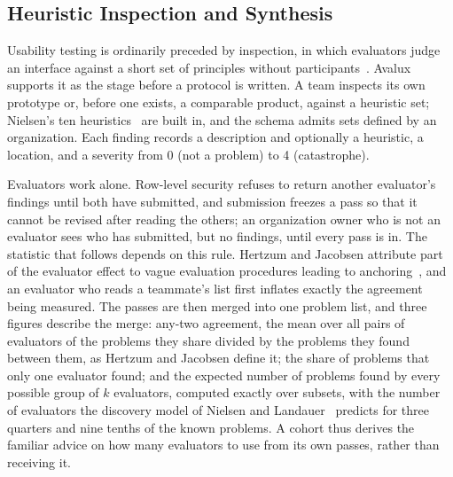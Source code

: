 \documentclass[conference]{IEEEtran}
\begin{document}
\subsection{Heuristic Inspection and Synthesis}
\label{sec:inspection}
Usability testing is ordinarily preceded by inspection, in which evaluators
judge an interface against a short set of principles without
participants~\cite{nielsen1990heuristic}. Avalux supports it as the stage
before a protocol is written. A team inspects its own prototype or, before
one exists, a comparable product, against a heuristic set; Nielsen's ten
heuristics~\cite{nielsen1994enhancing} are built in, and the schema admits
sets defined by an organization. Each finding records a description and
optionally a heuristic, a location, and a severity from 0 (not a problem)
to 4 (catastrophe).

Evaluators work alone. Row-level security refuses to return another
evaluator's findings until both have submitted, and submission freezes a
pass so that it cannot be revised after reading the others; an organization
owner who is not an evaluator sees who has submitted, but no findings,
until every pass is in. The statistic that follows depends on this rule.
Hertzum and Jacobsen attribute part of the evaluator effect to vague
evaluation procedures leading to anchoring~\cite{hertzum2001evaluator}, and
an evaluator who reads a teammate's list first inflates exactly the
agreement being measured. The passes are then merged into one problem list,
and three figures describe the merge: any-two agreement, the mean over all
pairs of evaluators of the problems they share divided by the problems they
found between them, as Hertzum and Jacobsen define it; the share of
problems that only one evaluator found; and the expected number of problems
found by every possible group of $k$ evaluators, computed exactly over
subsets, with the number of evaluators the discovery model of Nielsen and
Landauer~\cite{nielsen1993mathematical} predicts for three quarters and nine
tenths of the known problems. A cohort thus derives the familiar
advice on how many evaluators to use from its own passes, rather than
receiving it.
\end{document}
